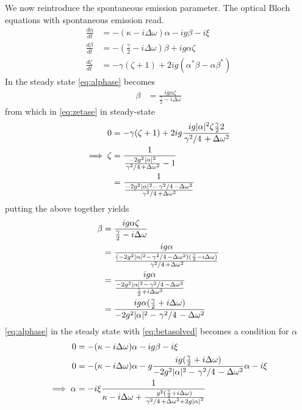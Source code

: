 We now reintroduce the spontaneous emission parameter.
The optical Bloch equations with spontaneous emission read. 
\begin{align}
  \frac{d \alpha}{dt} &= -(\kappa - i \Delta \omega)\alpha - ig \beta - i\xi\label{eq:alphase}\\
  \frac{d \beta}{dt} &= -(\frac{\gamma}{2}-i\Delta\omega)\beta+ig\alpha\zeta \label{eq:betase}\\
  \frac{d\zeta}{dt} &= -\gamma (\zeta +1)+2ig(\alpha^*\beta-\alpha\beta^*) \label{eq:zetase}
\end{align}
In the steady state \cref{eq:alphase} becomes
\begin{align}
  \beta &= \frac{ig\alpha\zeta}{\frac{\gamma}{2}-i\Delta\omega}
\end{align}
from which in \cref{eq:zetase} in steady-state
\begin{align}
  0 &= -\gamma(\zeta+1)+2ig\frac{ig|\alpha|^2\zeta\frac{\gamma}{2}2}{\flatfrac{\gamma^2}{4}+\Delta\omega^2} \\
  \implies \zeta &= \frac{1}{\frac{-2g^2|\alpha|^2}{\flatfrac{\gamma^2}{4} +\Delta\omega^2}-1} \\
  &= \frac{1}{\frac{-2g^2|\alpha|^2 - \flatfrac{\gamma^2}{4}-\Delta\omega^2}{\flatfrac{\gamma^2}{4} +\Delta\omega^2}}
\end{align}
putting the above together yields
\begin{align}
  \beta &= \frac{ig\alpha\zeta}{\frac{\gamma}{2}-i\Delta\omega}\\
  &= \frac{ig\alpha}{\frac{(-2g^2|\alpha|^2-\flatfrac{\gamma^2}{4}-\Delta\omega^2)(\frac{\gamma}{2}-i\Delta\omega)}{\flatfrac{\gamma^2}{4}+\Delta\omega^2}}\\
  &= \frac{ig\alpha}{\frac{-2g^2|\alpha|^2-\flatfrac{\gamma^2}{4}-\Delta\omega^2}{\frac{\gamma}{2}+i\Delta\omega^2}}\\
  &= \frac{ig\alpha(\frac{\gamma}{2}+i\Delta\omega)}{-2g^2|\alpha|^2-\flatfrac{\gamma^2}{4}-\Delta\omega^2} \label{eq:betasolved}
\end{align}
\cref{eq:alphase} in the steady state with  \cref{eq:betasolved} becomes a condition for $\alpha$
\begin{align} %
  0&=-(\kappa-i\Delta\omega)\alpha-ig\beta-i\xi \\
  0&=-{(\kappa-i\Delta\omega)}\alpha-g\frac{ig(\frac{\gamma}{2}+i\Delta\omega)}{-2g^2|\alpha|^2-\flatfrac{\gamma^2}{4}-\Delta\omega^2}\alpha-i\xi \\
\implies \alpha &= -i\xi \frac{1}{\kappa-i\Delta\omega+\frac{g^2(\frac{\gamma}{2}+i\Delta\omega)}{\flatfrac{\gamma^2}{4}+{\Delta\omega}^2+2g{|\alpha|}^2}}\label{eq:alphadetdiss}
\end{align}

